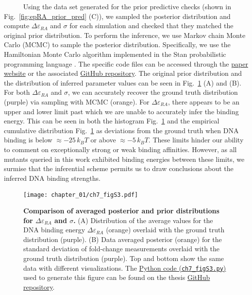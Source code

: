 \documentclass[12pt]{caltech_thesis}
\begin{document}
~~~~~ Using the data set generated for the prior predictive checks
(shown in Fig.~\ref{fig:epRA_prior_pred} (C)), we sampled the posterior
distribution and compute \(\Delta\varepsilon_{RA}\) and \(\sigma\) for
each simulation and checked that they matched the original prior
distribution. To perform the inference, we use Markov chain Monte Carlo
(MCMC) to sample the posterior distribution. Specifically, we use the
Hamiltonian Monte Carlo algorithm implemented in the Stan probabilistic
programming language \autocite{carpenter2017}. The specific code files
can be accessed through the
\href{http://rpgroup.caltech.edu/mwc_mutants}{paper website} or the
associated \href{https://github.com/rpgroup-pboc/mwc_mutants}{GitHub
repository}. The original prior distribution and the distribution of
inferred parameter values can be seen in Fig.~\ref{fig:epRA_sbc} (A) and
(B). For both \(\Delta\varepsilon_{RA}\) and \(\sigma\), we can
accurately recover the ground truth distribution (purple) via sampling
with MCMC (orange). For \(\Delta\varepsilon_{RA}\), there appears to be
an upper and lower limit past which we are unable to accurately infer
the binding energy. This can be seen in both the histogram
Fig.~\ref{fig:epRA_sbc} and the empirical cumulative distribution
Fig.~\ref{fig:epRA_sbc} as deviations from the ground truth when DNA
binding is below \(\approx -25\,k_BT\) or above \(\approx -5\,k_BT\).
These limits hinder our ability to comment on exceptionally strong or
weak binding affinities. However, as all mutants queried in this work
exhibited binding energies between these limits, we surmise that the
inferential scheme permits us to draw conclusions about the inferred DNA
binding strengths.

\hypertarget{fig:epRA_sbc}{%
\begin{figure}
\centering
\texttt{[image: chapter\_01/ch7\_figS3.pdf]}
\caption[{Comparison of averaged posterior and prior distributions for
DNA binding energy and homoscedastic error.}]{\textbf{Comparison of
averaged posterior and prior distributions for
\(\Delta\varepsilon_{RA}\) and \(\sigma\).} (A) Distribution of the
average values for the DNA binding energy \(\Delta\varepsilon_{RA}\)
(orange) overlaid with the ground truth distribution (purple). (B) Data
averaged posterior (orange) for the standard deviation of fold-change
measurements overlaid with the ground truth distribution (purple). Top
and bottom show the same data with different visualizations. The
\href{https://github.com/gchure/phd/blob/master/src/chapter_07/code/ch7_figS3.py}{Python
code (\texttt{ch7\_figS3.py})} used to generate this figure can be found
on the thesis \href{https://github.com/gchure/phd}{GitHub repository}.}
\label{fig:epRA_sbc}
\end{figure}
}
\end{document}
